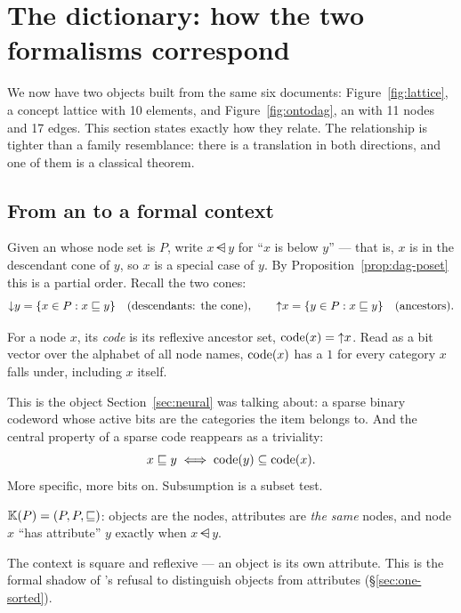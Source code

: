 \section{The dictionary: how the two formalisms correspond}
\label{sec:dictionary}

We now have two objects built from the same six documents:
Figure~\ref{fig:lattice}, a concept lattice with 10 elements, and
Figure~\ref{fig:ontodag}, an \odag{} with 11 nodes and 17 edges. This section
states exactly how they relate. The relationship is tighter than a family
resemblance: there is a translation in both directions, and one of them is a
classical theorem.

\subsection{From an \odag{} to a formal context}

Given an \odag{} whose node set is $P$, write $x \dsub y$ for ``$x$ is below
$y$'' --- that is, $x$ is in the descendant cone of $y$, so $x$ is a special
case of $y$. By Proposition~\ref{prop:dag-poset} this is a partial order.
Recall the two cones:
\[
  \mathord{\downarrow}y = \{x \in P : x \sqsubseteq y\} \quad\text{(descendants: the cone)},
  \qquad
  \mathord{\uparrow}x = \{y \in P : x \sqsubseteq y\} \quad\text{(ancestors)} .
\]

\begin{definition}
For a node $x$, its \emph{code} is its reflexive ancestor set,
$\mathrm{code}(x) = \mathord{\uparrow}x$. Read as a bit vector over the alphabet of all node names,
$\mathrm{code}(x)$ has a $1$ for every category $x$ falls under, including $x$ itself.
\end{definition}

This is the object Section~\ref{sec:neural} was talking about: a sparse binary
codeword whose active bits are the categories the item belongs to. And the
central property of a sparse code reappears as a triviality:
\[
  x \sqsubseteq y \iff \mathrm{code}(y) \subseteq \mathrm{code}(x) .
\]
More specific, more bits on. Subsumption is a subset test.

\begin{definition}
$\mathbb{K}(P) = (P, P, \sqsubseteq)$: objects are the nodes, attributes are \emph{the
same} nodes, and node $x$ ``has attribute'' $y$ exactly when $x \dsub y$.
\end{definition}

The context is square and reflexive --- an object is its own attribute. This
is the formal shadow of \odag{}'s refusal to distinguish objects from
attributes (\S\ref{sec:one-sorted}).

